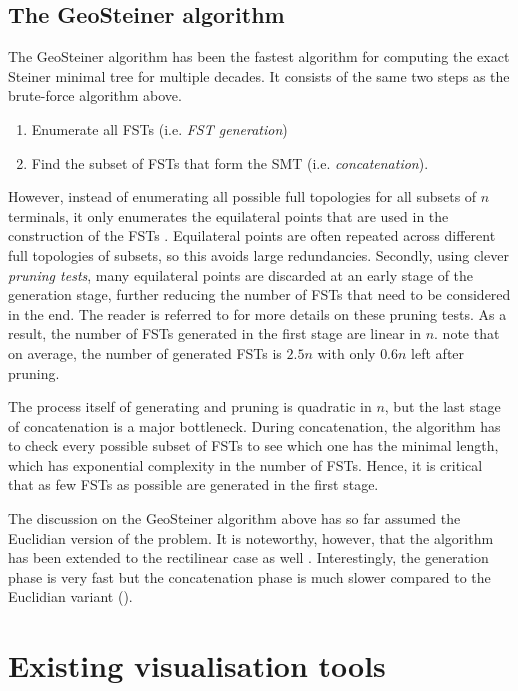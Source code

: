 \documentclass{l4proj}
\begin{document}
\subsection{The GeoSteiner algorithm}
The GeoSteiner algorithm has been the fastest algorithm for computing the exact Steiner minimal tree for multiple decades.
It consists of the same two steps as the brute-force algorithm above.
\begin{enumerate}
    \item Enumerate all FSTs (i.e. \textit{FST generation})
    \item Find the subset of FSTs that form the SMT (i.e. \textit{concatenation}).
\end{enumerate}
However, instead of enumerating all possible full topologies for all subsets of $n$ terminals, it only enumerates the equilateral points that are used in the construction of the FSTs \citep{geosteiner96}. Equilateral points are often repeated across different full topologies of subsets, so this avoids large redundancies. Secondly, using clever \textit{pruning tests}, many equilateral points are discarded at an early stage of the generation stage, further reducing the number of FSTs that need to be considered in the end. The reader is referred to \cite{geosteiner96} for more details on these pruning tests.
As a result, the number of FSTs generated in the first stage are linear in $n$. \cite{29ee725d11ac4584b72f7fe66c4326fa} note that on average, the number of generated FSTs is $2.5n$ with only $0.6n$ left after pruning.

The process itself of generating and pruning is quadratic in $n$, but the last stage of concatenation is a major bottleneck. During concatenation, the algorithm has to check every possible subset of FSTs to see which one has the minimal length, which has exponential complexity in the number of FSTs. Hence, it is critical that as few FSTs as possible are generated in the first stage.

The discussion on the GeoSteiner algorithm above has so far assumed the Euclidian version of the problem. It is noteworthy, however, that the algorithm has been extended to the rectilinear case as well \citep{rectilinear_geosteiner}. Interestingly, the generation phase is very fast but the concatenation phase is much slower compared to the Euclidian variant (\citep{29ee725d11ac4584b72f7fe66c4326fa}).


\section{Existing visualisation tools}
\label{sec:existing_tools}
\end{document}
